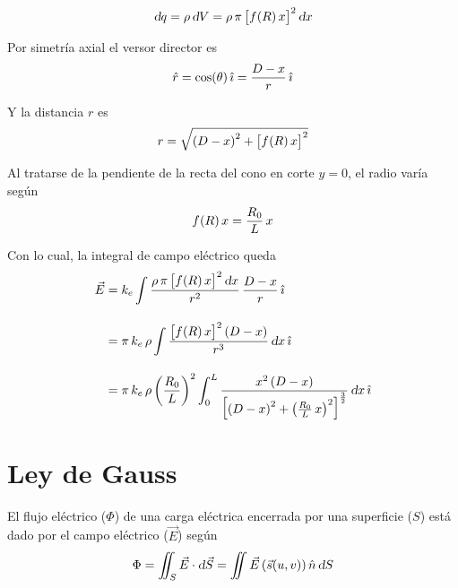 \begin{mdframed}[style=ExampleFrame]

    \begin{equation*}
        \textsl{d} q = \rho \, \textsl{d} V = \rho \, \pi \, { \begin{bmatrix} f \hspace{-0.5mm} \left( R \right){x} \end{bmatrix} }^2 \, \textsl{d} x
    \end{equation*}

    Por simetría axial el versor director es
    \begin{equation*}
        \hat{r} = \cos(\theta) \, \hat{\imath}
        = \frac{D-x}{r} \, \hat{\imath}
    \end{equation*}

    Y la distancia $r$ es
    \begin{equation*}
        r = \sqrt{\left(D-x\right)^2 + { \begin{bmatrix} f \hspace{-0.5mm} \left( R \right){x} \end{bmatrix} }^2}
    \end{equation*}

    Al tratarse de la pendiente de la recta del cono en corte $y=0$, el radio varía según
    \begin{equation*}
        f \hspace{-0.5mm} \left( R \right){x} = \frac{R_0}{L} \, x
    \end{equation*}

    Con lo cual, la integral de campo eléctrico queda
    \begin{align*}
        \vec{E} &= k_e \int \frac{\rho \, \pi \, { \begin{bmatrix} f \hspace{-0.5mm} \left( R \right){x} \end{bmatrix} }^2 \, \textsl{d} x}{r^2} \, \frac{D-x}{r} \, \hat{\imath}
        \\[1em]
        &= \pi \, k_e \, \rho \int \frac{{ \begin{bmatrix} f \hspace{-0.5mm} \left( R \right){x} \end{bmatrix} }^2 \left(D-x\right)}{r^3} \, \textsl{d} x \, \hat{\imath}
        \\[1em]
        &= \pi \, k_e \, \rho \left(\frac{R_0}{L}\right)^2 \int_0^L \frac{x^2 \left(D-x\right)}{{ \begin{bmatrix} \left(D-x\right)^2 + \left(\frac{R_0}{L} \, x\right)^2 \end{bmatrix} }^{\frac{3}{2}}} \, \textsl{d} x \, \hat{\imath}
    \end{align*}
\end{mdframed}


\section{Ley de Gauss}

El flujo eléctrico ($\Phi$) de una carga eléctrica encerrada por una superficie ($S$) está dado por el campo eléctrico ($\Vec{E}$) según
\begin{equation*}
    \Phi = \iint_S \Vec{E} \cdot \textsl{d} \Vec{S} = \iint \Vec{E} \left(\Vec{s}(u,v)\right) \hat{n} \, \textsl{d} S
\end{equation*}

